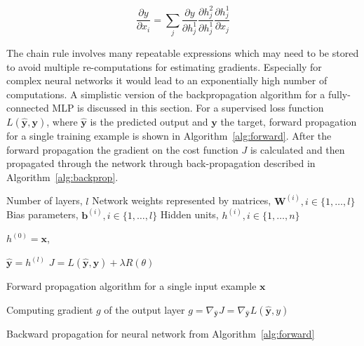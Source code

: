\begin{equation}
\frac{\partial y}{\partial x_{i}}=\sum_{j} \frac{\partial y}{\partial h^{1}_{j}} \frac{\partial h^{2}_{j}}{\partial h^{1}_{j}}\frac{\partial h^{1}_{j}}{\partial x_{j}}
\end{equation}

The chain rule involves many repeatable expressions which may need to be stored to avoid multiple re-computations for estimating gradients. Especially for complex neural networks it would lead to an exponentially high number of computations. A simplistic version of the backpropagation algorithm for a fully-connected \ac{MLP} is discussed in this section. For a supervised loss function $L(\hat{\boldsymbol{y}},\boldsymbol{y})$, where $\hat{\boldsymbol{y}}$ is the predicted output and $\boldsymbol{y}$ the target, forward propagation for a single training example is shown in Algorithm~\ref{alg:forward}. After the forward propagation the gradient on the cost function $J$ is calculated and then propagated through the network through back-propagation described in Algorithm~\ref{alg:backprop}. 
\begin{algorithm}
	\SetAlgoLined
	Number of layers, $l$ \;
    Network weights represented by matrices, $\boldsymbol{W}^{(i)},i \in \{1,\dots,l\}$ \;
	Bias parameters, $\boldsymbol{b}^{(i)},i \in \{1,\dots,l\}$ \;
	Hidden units, $h^{(i)}, i \in \{1,\dots,n\}$ \;
    
	$h^{(0)} = \boldsymbol{x} $,  \;
    
	$\hat{\boldsymbol{y}} = h^{(l)}$			\;
	$J = L(\hat{\boldsymbol{y}},\boldsymbol{y}) + \lambda R(\theta)$  \;
	\caption{Forward propagation algorithm for a single input example $\boldsymbol{x}$}
	\label{alg:forward}
\end{algorithm}

\begin{algorithm}
	\SetAlgoLined
	Computing gradient $g$ of the output layer\;
	$g = \nabla_{\hat{\boldsymbol{y}}} J = \nabla_{\hat{\boldsymbol{y}}} L (\hat{\boldsymbol{y}},y) $
	
	\caption{Backward propagation for neural network from Algorithm~\ref{alg:forward}}
	\label{alg:backprop}
\end{algorithm}

